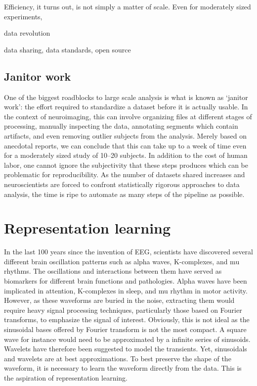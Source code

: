 Efficiency, it turns out, is not simply a matter of scale. Even for moderately sized experiments,

%

data revolution


data sharing, data standards, open source

\subsection{Janitor work}

One of the biggest roadblocks to large scale analysis is what is known as `janitor work': the effort required to standardize a dataset before it is actually usable. In the context of neuroimaging, this can involve organizing files at different stages of processing, manually inspecting the data, annotating segments which contain artifacts, and even removing outlier subjects from the analysis. Merely based on anecdotal reports, we can conclude that this can take up to a week of time even for a moderately sized study of 10--20 subjects.
In addition to the cost of human labor, one cannot ignore the subjectivity that these steps produces which can be problematic for reproducibility. As the number of datasets shared increases and neuroscientists are forced to confront statistically rigorous approaches to data analysis, the time is ripe to automate as many steps of the pipeline as possible.

\section{Representation learning}
In the last 100 years since the invention of EEG, scientists have discovered several different brain oscillation patterns such as alpha waves, K-complexes, and mu rhythms. The oscillations and interactions between them have served as biomarkers for different brain functions and pathologies. Alpha waves have been implicated in attention, K-complexes in sleep, and mu rhythm in motor activity. However, as these waveforms are buried in the noise, extracting them would require heavy signal processing techniques, particularly those based on Fourier transforms, to emphasize the signal of interest. Obviously, this is not ideal as the sinusoidal bases offered by Fourier transform is not the most compact. A square wave for instance would need to be approximated by a infinite series of sinusoids. Wavelets have therefore been suggested to model the transients. Yet, sinusoidals and wavelets are at best approximations. To best preserve the shape of the waveform, it is necessary to learn the waveform directly from the data. This is the aspiration of representation learning.

